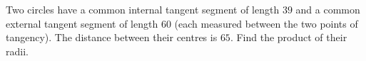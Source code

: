 Two circles have a common internal tangent segment of length \(39\) and a common external tangent segment of length \(60\) (each measured between the two points of tangency). The distance between their centres is \(65\). Find the product of their radii.
